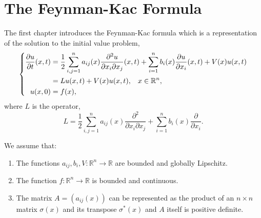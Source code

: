 \documentclass[a4paper,12pt,draft]{report}
\theoremstyle{remark}
\theoremstyle{definition}
\begin{document}
\chapter{The Feynman-Kac Formula}

The first chapter introduces the Feynman-Kac formula which is a representation of the solution to the initial value problem,
\begin{equation}
\left\{
\begin{aligned}
\frac{\partial u}{\partial t}(x, t) & = \frac{1}{2}\sum_{i, j = 1}^n a_{ij}(x)\frac{\partial^2 u}{\partial x_i \partial x_j}(x, t) + \sum_{i = 1}^n b_i(x)\frac{\partial u}{\partial x_i}(x, t) + V(x)u(x, t)\\
& = Lu(x, t) + V(x)u(x, t), \hspace{0.3cm} x \in \mathbb{R}^n,\\ \label{CP}
u(x, 0) & = f(x),
\end{aligned}
\right.
\end{equation}
where $L$ is the operator,
$$
L = \frac{1}{2}\sum_{i, j = 1}^n a_{ij}(x)\frac{\partial^2}{\partial x_i \partial x_j} + \sum_{i = 1}^n b_i(x)\frac{\partial}{\partial x_i}.
$$
\assume
{
We assume that:
\begin{enumerate}
\item The functions $a_{ij}, b_i, V : \mathbb{R}^n \to \mathbb{R}$ are bounded and globally Lipschitz.
\item The function $f : \mathbb{R}^n \to \mathbb{R}$ is bounded and continuous.
\item The matrix $A = (a_{ij}(x))$ can be represented as the product of an $n \times n$ matrix $\sigma(x)$ and its transpose $\sigma^*(x)$ and $A$ itself is positive definite.
\end{enumerate}
}
\end{document}
